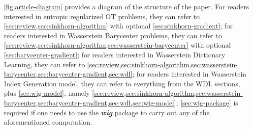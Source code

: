 \cref{fig:article-diagram} provides a diagram of the structure of the paper.
For readers interested in entropic regularized OT problems,
they can refer to \cref{sec:review,sec:sinkhorn-algorithm} with optional \cref{sec:sinkhorn-gradient};
for readers interested in Wasserstein Barycenter problems,
they can refer to \cref{sec:review,sec:sinkhorn-algorithm,sec:wasserstein-barycenter}
with optional \cref{sec:barycenter-gradient};
for readers interested in Wasserstein Dictionary Learning,
they can refer to \cref{sec:review,sec:sinkhorn-algorithm,sec:wasserstein-barycenter,sec:barycenter-gradient,sec:wdl};
for readers interested in Wasserstein Index Generation model,
they can refer to everything from the WDL sections, plus \cref{sec:wig-model},
namely \cref{sec:review,sec:sinkhorn-algorithm,sec:wasserstein-barycenter,sec:barycenter-gradient,sec:wdl,sec:wig-model};
\cref{sec:wig-package} is required if one needs to use the \textbf{\textit{wig}} package to carry out
any of the aforementioned computation.
